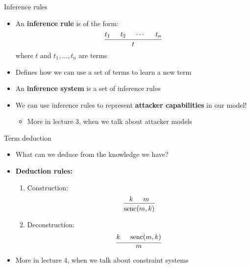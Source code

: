 \documentclass[11pt,aspectratio=169]{beamer}
\begin{document}
\begin{frame}[fragile]{Inference rules}
    \begin{itemize}
        \item An \textbf{inference rule} is of the form:
        \begin{equation*}
            \begin{prooftree}
                \hypo{t_1}
                \hypo{t_2}
                \hypo{\cdots}
                \hypo{t_n}
                \infer4{t}
            \end{prooftree}
        \end{equation*}
        where $t$ and $t_1, \dots, t_n$ are terms
        \item Defines how we can use a set of terms to learn a new term
        \item An \textbf{inference system} is a set of inference rules
        \item We can use inference rules to represent
              \textbf{attacker capabilities} in our model!
        \begin{itemize}
            \item More in lecture 3, when we talk about attacker models
        \end{itemize}
    \end{itemize}
\end{frame}

\begin{frame}[fragile]{Term deduction}
    \begin{itemize}
        \item What can we deduce from the knowledge we have?
        \item \textbf{Deduction rules:}
            \begin{enumerate}
                \item Construction:
                    \begin{equation*}
                        \begin{prooftree}
                            \hypo{k}
                            \hypo{m}
                            \infer2{\senc(m, k)}
                        \end{prooftree}
                    \end{equation*}
                \item Deconstruction:
                    \begin{equation*}
                        \begin{prooftree}
                            \hypo{k}
                            \hypo{\senc(m, k)}
                            \infer2{m}
                        \end{prooftree}
                    \end{equation*}
            \end{enumerate}
        \item More in lecture 4, when we talk about constraint systems
    \end{itemize}
\end{frame}
\end{document}
